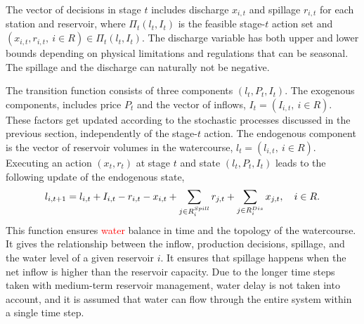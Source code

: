 The vector of decisions in stage $t$ includes discharge $x_{i,t}$ and spillage $r_{i,t}$ for each station and reservoir, where $\Pi_t(l_t,I_t)$ is the feasible stage-$t$ action set and $(x_{i,t},r_{i,t}, \ i \in R) \in \Pi_t(l_t,I_t)$. The discharge variable has both upper and lower bounds depending on physical limitations and regulations that can be seasonal. The spillage and the discharge can naturally not be negative. %

The transition function consists of three components $(l_t,P_t,I_t)$. The exogenous components, includes price $P_t$ and the vector of inflows, $I_t = (I_{i,t}, \ i \in R)$. These factors get updated according to the stochastic processes discussed in the previous section, independently of the stage-$t$ action. The endogenous component is the vector of reservoir volumes in the watercourse, $l_t = (l_{i,t}, \ i \in R)$. Executing an action $(x_t,r_t)$ at stage $t$ and state $(l_t,P_t,I_t)$ leads to the following update of the endogenous state,
\begin{equation}
\label{eq:inventory_balance}
    l_{i,t+1} = l_{i,t} + I_{i,t} - r_{i,t} - x_{i,t} + \sum_{j\in R_{i}^{Spill}} r_{j,t}+ \sum_{j\in R_{i}^{Dis}} x_{j,t},\\ \quad  i\in R. %
\end{equation}
This function ensures \textcolor{red}{water} balance in time and the topology of the watercourse. It gives the relationship between the inflow, production decisions, spillage, and the water level of a given reservoir $i$. It ensures that spillage happens when the net inflow is higher than the reservoir capacity. Due to the longer time steps taken with medium-term reservoir management, water delay is not taken into account, and it is assumed that water can flow through the entire system within a single time step. 



